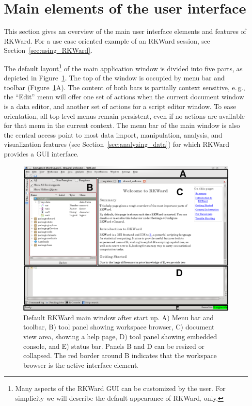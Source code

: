 \section{Main elements of the user interface}
\label{sec:user_interface}
This section gives an overview of the main user interface elements and features of RKWard.
For a use case oriented example of an RKWard session, see Section~\ref{sec:using_RKWard}.

The default layout\footnote{
 Many aspects of the RKWard GUI can be customized by the user. For simplicity we will
 describe the default appearance of RKWard, only.
} of the main application window is divided into five
parts, as depicted in Figure~\ref{fig:main_window}. The top of the window is occupied by menu bar and toolbar 
(Figure~\ref{fig:main_window}A). The content of both bars is partially context
sensitive, e.\,g., the ``Edit'' menu will offer
one set of actions when the current document window is a data editor,
and another set of actions for a  script
editor window. To ease orientation, all top level menus remain
persistent, even if no actions are available for that menu in the
current context. The menu bar of the main window is also the central
access point to most data import, manipulation, analysis, and
visualization features (see Section~\ref{sec:analyzing_data}) for which RKWard provides a GUI
interface.

\begin{figure}[b!]
 \centering
 \includegraphics[width=15.450cm]{../figures/main_window.png}
 \caption{Default RKWard main window after start up. 
A) Menu bar and toolbar, B) tool panel showing workspace browser, C) document view area, showing
a help page, D) tool panel showing embedded  console, and E) status bar.
Panels B and D can be resized or collapsed. The red border around B indicates that the workspace browser is the active interface element.}
 \label{fig:main_window}
\end{figure}


